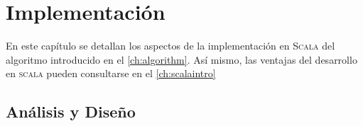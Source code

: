 \chapter{Implementación}
\label{ch:impl}

En este capítulo se detallan los aspectos de la implementación en \textsc{Scala}
del algoritmo introducido en el \autoref{ch:algorithm}. Así mismo, las ventajas
del desarrollo en \textsc{scala} pueden consultarse en el \autoref{ch:scalaintro}

\section{Análisis y Diseño}
\label{sec:design}

